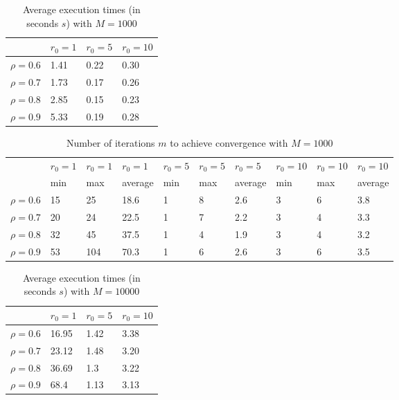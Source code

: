 \documentclass[a4paper,11pt,openright]{report}
\begin{document}
\begin{table}[H]
\centering
\addtolength{\leftskip}{-1.5cm}
\addtolength{\rightskip}{-1.5cm}
\begin{tabular}{|c|lll|}
\hline
$ $ & $r_0 = 1$ & $r_0 = 5$ & $r_0 = 10$ \\
\hline
$\rho = 0.6$ & 1.41 & 0.22 & 0.30 \\

$\rho = 0.7$ & 1.73 & 0.17 & 0.26 \\

$\rho = 0.8$ & 2.85 & 0.15 & 0.23 \\

$\rho = 0.9$ & 5.33 & 0.19 & 0.28 \\
\hline
\end{tabular}
\caption{Average execution
 times (in seconds $s$) with $M = 1000$}
\end{table}
\begin{table}[H]
\centering
\addtolength{\leftskip}{-1.5cm}
\addtolength{\rightskip}{-1.5cm}
\begin{tabular}{|c|lllllllll|}
\hline
$ $ & $r_0 = 1$ & $r_0 = 1$ & $r_0 = 1$ & $r_0 = 5$ & $r_0 = 5$ & $r_0 = 5$ & $r_0 = 10$ & $r_0 = 10$ & $r_0 = 10$  \\
$ $ & min & max & average & min & max & average & min & max & average \\ 
\hline
$\rho = 0.6$ & 15 & 25 & 18.6 & 1 & 8 & 2.6 & 3 & 6 & 3.8\\

$\rho = 0.7$ & 20 & 24 & 22.5 & 1 & 7 & 2.2 & 3 & 4 & 3.3\\

$\rho = 0.8$ & 32 & 45 & 37.5 & 1 & 4 & 1.9 & 3 & 4 & 3.2\\

$\rho = 0.9$ & 53 & 104 & 70.3 & 1 & 6 & 2.6 & 3 & 6 & 3.5\\
\hline
\end{tabular}
\caption{Number of iterations $m$ to achieve convergence with $M = 1000$}
\end{table}
\begin{table}[H]
\centering
\addtolength{\leftskip}{-1.5cm}
\addtolength{\rightskip}{-1.5cm}
\begin{tabular}{|c|lll|}
\hline
$ $ & $r_0 = 1$ & $r_0 = 5$ & $r_0 = 10$ \\
\hline
$\rho = 0.6$ & 16.95 & 1.42 & 3.38 \\

$\rho = 0.7$ & 23.12 & 1.48 & 3.20 \\

$\rho = 0.8$ & 36.69 & 1.3 & 3.22 \\

$\rho = 0.9$ & 68.4 & 1.13 & 3.13 \\
\hline
\end{tabular}
\caption{Average execution
 times (in seconds $s$) with $M = 10000$}
\end{table}
\end{document}
